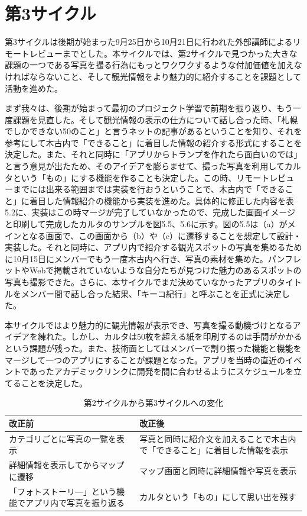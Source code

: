 \section{第3サイクル}
第3サイクルは後期が始まった9月25日から10月21日に行われた外部講師によるリモートレビューまでとした。本サイクルでは、第2サイクルで見つかった大きな課題の一つである写真を撮る行為にもっとワクワクするような付加価値を加えなければならないこと、そして観光情報をより魅力的に紹介することを課題として活動を進めた。
\par まず我々は、後期が始まって最初のプロジェクト学習で前期を振り返り、もう一度課題を見直した。そして観光情報の表示の仕方について話し合った時、「札幌でしかできない50のこと」と言うネットの記事があるということを知り、それを参考にして木古内で「できること」に着目した情報の紹介する形式にすることを決定した。また、それと同時に「アプリからトランプを作れたら面白いのでは」と言う意見が出たため、そのアイデアを膨らませて、撮った写真を利用してカルタという「もの」にする機能を作ることも決定した。この時、リモートレビューまでには出来る範囲までは実装を行おうということで、木古内で「できること」に着目した情報紹介の機能から実装を進めた。具体的に修正した内容を表5.2に、実装はこの時マージが完了していなかったので、完成した画面イメージと印刷して完成したカルタのサンプルを図5.5、5.6に示す。図の5.5は（a）がメインとなる画面で、この画面から（b）や（c）に遷移することを想定して設計・実装した。それと同時に、アプリ内で紹介する観光スポットの写真を集めるために10月15日にメンバーでもう一度木古内へ行き、写真の素材を集めた。パンフレットやWebで掲載されていないような自分たちが見つけた魅力のあるスポットの写真も撮影できた。さらに、本サイクルでまだ決めていなかったアプリのタイトルをメンバー間で話し合った結果、「キーコ紀行」と呼ぶことを正式に決定した。
\par 本サイクルではより魅力的に観光情報が表示でき、写真を撮る動機づけとなるアイデアを練れた。しかし、カルタは50枚を超える紙を印刷するのは手間がかかるという課題が残った。また、技術面としてはメンバーで割り振った機能と機能をマージして一つのアプリにすることが課題となった。アプリを当時の直近のイベントであったアカデミックリンクに開発を間に合わせるようにスケジュールを立てることを決定した。\newpage

\begin{table}[htb]
\centering
\addtocounter{table}{+0}
\caption{第2サイクルから第3サイクルへの変化}
  \begin{tabular}{|l|l|} \hline
    改正前&改正後  \\ \hline 
    カテゴリごとに写真の一覧を表示 & \parbox{20zw}{写真と同時に紹介文を加えることで木古内で「できること」に着目した情報を表示} \\  \hline
    詳細情報を表示してからマップに遷移 &\parbox{20zw}{マップ画面と同時に詳細情報や写真を表示}\\ \hline
    「フォトストーリ—」という機能でアプリ内で写真を振り返る & \parbox{20zw}{カルタという「もの」にして思い出を残す}\\ \hline
  \end{tabular} 
\end{table}

